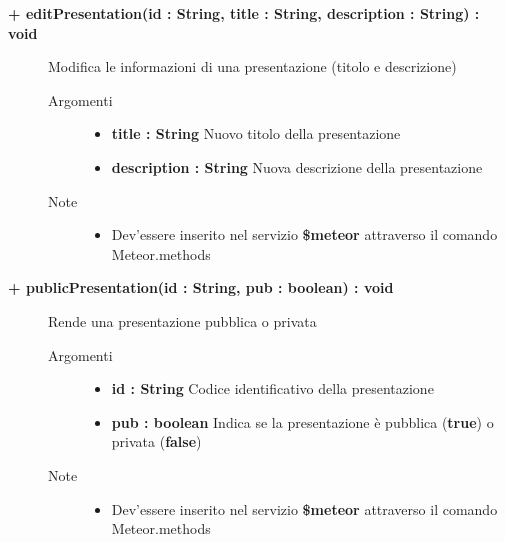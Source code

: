 \begin{description}
	\begin{description}
		\item[\textbf{\color{blue}+ editPresentation(id : String, title : String, description : String) : void			}] \hfill
			Modifica le informazioni di una presentazione (titolo e descrizione)
			
		\begin{description}
			\item[Argomenti] \hfill
				\begin{itemize}
				
					\item \textbf{title : String			} \hfill
					Nuovo titolo della presentazione
					\item \textbf{description : String			} \hfill
					Nuova descrizione della presentazione
					
				\end{itemize}
			\item[Note] \hfill
			\begin{itemize}
					\item Dev'essere inserito nel servizio \textbf{\$meteor} attraverso il comando Meteor.methods
				\end{itemize}
		\end{description}
	\end{description}

	\begin{description}
		\item[\textbf{\color{blue}+ publicPresentation(id : String, pub : boolean) : void			}] \hfill
			Rende una presentazione pubblica o privata
			
		\begin{description}
			\item[Argomenti] \hfill
				\begin{itemize}
				
					\item \textbf{id :  String			} \hfill
					Codice identificativo della presentazione
					\item \textbf{pub :  boolean			} \hfill
					Indica se la presentazione è pubblica (\textbf{true}) o privata (\textbf{false})
					
				\end{itemize}
			\item[Note] \hfill
			\begin{itemize}
					\item Dev'essere inserito nel servizio \textbf{\$meteor} attraverso il comando Meteor.methods
				\end{itemize}
		\end{description}
	\end{description}
	

\end{description}
